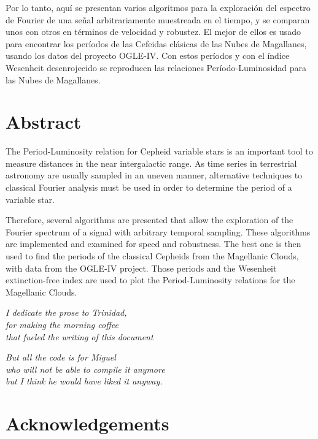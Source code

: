 \documentclass[12pt,letterpaper,oneside]{book}
\begin{document}
Por lo tanto, aquí se presentan varios algoritmos para la exploración del espectro de Fourier de una señal arbitrariamente muestreada en el tiempo,
y se comparan unos con otros en términos de velocidad y robustez.
El mejor de ellos es usado para encontrar los períodos de las Cefeidas clásicas de las Nubes de Magallanes, usando los datos del proyecto OGLE-IV.
Con estos períodos y con el índice Wesenheit desenrojecido se reproducen las relaciones Período-Luminosidad para las Nubes de Magallanes.

\chapter*{Abstract}

The Period-Luminosity relation for Cepheid variable stars is an important tool to measure distances in the near intergalactic range. 
As time series in terrestrial astronomy are usually sampled in an uneven manner, 
alternative techniques to classical Fourier analysis must be used in order to determine the period of a variable star.

Therefore, several algorithms are presented that allow the exploration of the Fourier spectrum of a signal with arbitrary temporal sampling.
These algorithms are implemented and examined for speed and robustness. 
The best one is then used to find the periods of the classical Cepheids from the Magellanic Clouds, with data from the OGLE-IV project. 
Those periods and the Wesenheit extinction-free index are used to plot the Period-Luminosity relations for the Magellanic Clouds.


\newpage

\begin{flushright}
	\textit{
		I dedicate the prose to Trinidad,        \\
		for making the morning coffee            \\
		that fueled the writing of this document
	}

	\vspace{5mm}

	\textit{
		But all the code is for Miguel             \\
		who will not be able to compile it anymore \\ 
		but I think he would have liked it anyway.
	}
\end{flushright}

\vspace{2mm}

\chapter*{Acknowledgements}
\end{document}
